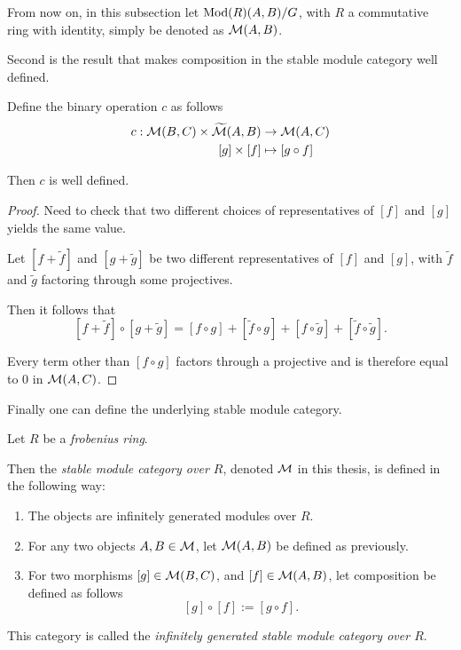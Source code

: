 From now on, in this subsection let \( \operatorname{Mod}(R)(A, B)/G \), with \( R \) a commutative ring with identity, simply be denoted as \( {\mathcal{M}}(A, B) \).

Second is the result that makes composition in the stable module category well defined.

\begin{lemma}
    \label{lem:stmod_composition_well-defined}
    Define the binary operation \( c \) as follows
    \begin{align*}
        c: {\mathcal{M}}(B, C) \times \widetilde{{\mathcal{M}}}(A, B) &\to {\mathcal{M}}(A, C) \\
        [g] \times [f] &\mapsto [g \circ f]
    \end{align*}

    Then \( c \) is well defined.
\end{lemma}
\begin{proof}
    Need to check that two different choices of representatives of \( [f] \) and \( [g] \) yields the same value.

    Let \( [f + \widetilde{f}] \) and \( [g + \widetilde{g}] \) be two different representatives of \( [f] \) and \( [g] \), with \( \widetilde{f} \) and \( \widetilde{g} \) factoring through some projectives.

    Then it follows that
    \[
        [f + \widetilde{f}] \circ [g + \widetilde{g}] = [f \circ g] + [\widetilde{f} \circ g] + [f \circ \widetilde{g}] + [\widetilde{f} \circ \widetilde{g}].
    \]
    
    Every term other than \( [f \circ g] \) factors through a projective and is therefore equal to \( 0 \) in \( {\mathcal{M}}(A, C) \).
\end{proof}

Finally one can define the underlying stable module category.

\begin{definition}
    \label{def:stable_module_category}
    Let \( R \) be a \emph{frobenius ring}.

    Then the \emph{stable module category over \( R \)}, denoted \( {\mathcal{M}} \) in this thesis, is defined in the following way:
    \begin{enumerate}
        \item {
            The objects are infinitely generated modules over \( R \).
        }
        \item {
            For any two objects \( A, B \in {\mathcal{M}} \), let \( {\mathcal{M}}(A, B) \) be defined as previously.
        }
        \item {
            For two morphisms \( [g] \in {\mathcal{M}}(B, C) \), and \( [f] \in {\mathcal{M}}(A, B) \), let composition be defined as follows
            \[
                [g] \circ [f] := [g \circ f].
            \]
        }
    \end{enumerate}

    This category is called the \emph{infinitely generated stable module category over \( R \)}.
\end{definition}

